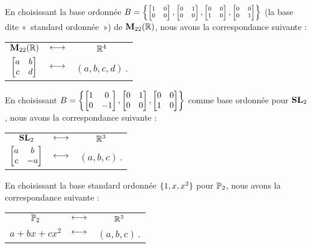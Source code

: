 \begin{example}
En choisissant la base ordonnée $B=\Big\{{\scriptsize\bmatrix 1&0\\0&0\endbmatrix, \bmatrix 0&1\\0&0\endbmatrix,\bmatrix 0&0\\1&0\endbmatrix,\bmatrix 0&0\\0&1\endbmatrix }\Big\}$ (la base dite «~standard ordonnée~») de $\M_{22}(\R)$, 
nous avons la correspondance suivante :

\begin{center}
\begin{tabular}{ccc}
$\M_{22}(\R)$  &$\leftarrow \kern-.1em\rightarrow$&  $\R^4$ \\ 
$\mat{a&b\\c&d}$&$\leftarrow \kern-.1em\rightarrow$ & $(a,b,c,d)$\,.
\end{tabular}
\end{center}
\end{example}

\begin{example}
En choisissant $B = \left\{\mat{1&0\\0 & -1}, \mat{0&1\\0&0}, \mat{0&0\\1&0}\right\}$ comme base ordonnée pour $\sl_2$, nous avons la correspondance suivante :

\begin{center}
\begin{tabular}{ccc}
$\sl_2 $ &$\leftarrow \kern-.1em\rightarrow$& $\R^3$ \\ 
$\mat{a&b\\c&-a}$&$\leftarrow \kern-.1em\rightarrow$ & $(a,b,c)$\,.
\end{tabular}
\end{center}
\end{example}

\begin{example}
En choisissant la base standard ordonnée $\set{1, x, x^2}$ pour $\PP_2$, nous avons la correspondance suivante :

\begin{center}
\begin{tabular}{ccc}
$\PP_2$ &$\leftarrow \kern-.1em\rightarrow$& $\R^3$ \\ 
$a+bx+cx^2$&$\leftarrow \kern-.1em\rightarrow$ & $(a,b,c)$\,.
\end{tabular}
\end{center}
\end{example}



